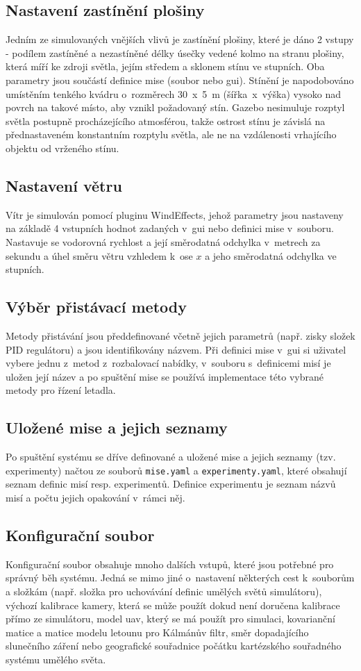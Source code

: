     \subsection{Nastavení zastínění plošiny}
      Jedním ze simulovaných vnějších vlivů je zastínění plošiny, které je dáno 2 vstupy - podílem zastíněné a nezastíněné délky úsečky vedené kolmo na stranu plošiny, která míří ke zdroji světla, jejím středem a sklonem stínu ve stupních. Oba parametry jsou součástí definice mise (soubor nebo \acrshort{gui}). Stínění je napodobováno umístěním tenkého kvádru o~rozměrech 30~x~5~m (šířka~x~výška) vysoko nad povrch na takové místo, aby vznikl požadovaný stín. Gazebo nesimuluje rozptyl světla postupně procházejícího atmosférou, takže ostrost stínu je závislá na přednastaveném konstantním rozptylu světla, ale ne na vzdálenosti vrhajícího objektu od vrženého stínu.
    \subsection{Nastavení větru}
      Vítr je simulován pomocí pluginu WindEffects, jehož parametry jsou nastaveny na základě 4 vstupních hodnot zadaných v~\acrshort{gui} nebo definici mise v~souboru. Nastavuje se vodorovná rychlost a její směrodatná odchylka v~metrech za sekundu a úhel směru větru vzhledem k~ose $x$ a jeho směrodatná odchylka ve stupních.
    \subsection{Výběr přistávací metody}
      Metody přistávání jsou předdefinované včetně jejich parametrů (např. zisky složek PID regulátoru) a jsou identifikovány názvem. Při definici mise v~\acrshort{gui} si uživatel vybere jednu z~metod z~rozbalovací nabídky, v~souboru s~definicemi misí je uložen její název a po spuštění mise se používá implementace této vybrané metody pro řízení letadla.
    \subsection{Uložené mise a jejich seznamy} \label{sec:saved}
      Po spuštění systému se dříve definované a uložené mise a jejich seznamy (tzv. experimenty) načtou ze souborů \texttt{mise.yaml} a \texttt{experimenty.yaml}, které obsahují seznam definic misí resp. experimentů. Definice experimentu je seznam názvů misí a počtu jejich opakování v~rámci něj.
    \subsection{Konfigurační soubor}
      Konfigurační soubor obsahuje mnoho dalších vstupů, které jsou potřebné pro správný běh systému. Jedná se mimo jiné o~nastavení některých cest k~souborům a složkám (např. složka pro uchovávání definic umělých světů simulátoru), výchozí kalibrace kamery, která se může použít dokud není doručena kalibrace přímo ze simulátoru, model \acrshort{uav}, který se má použít pro simulaci, kovarianční matice a matice modelu letounu pro Kálmánův filtr, směr dopadajícího slunečního záření nebo geografické souřadnice počátku kartézského souřadného systému umělého světa.
